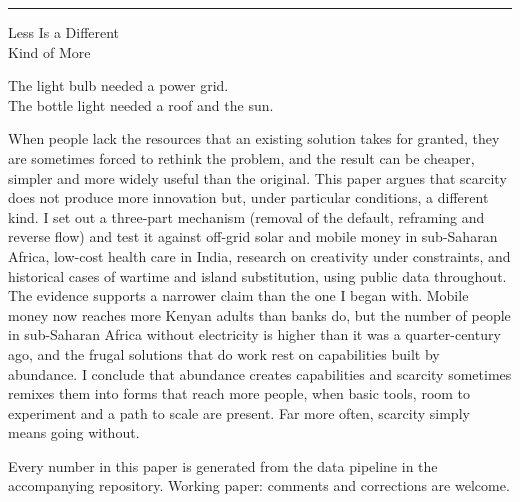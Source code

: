 \begin{titlepage}
\thispagestyle{empty}
\setlength{\parindent}{0pt}
\vspace*{0.1in}

{\sffamily\footnotesize\color{stone}
 \hfill \textls[60]{\MakeUppercase{\paperseries}}\par}
\vspace{6pt}
{\color{indigo}\rule{\linewidth}{1.2pt}}
\vspace{0.42in}

{\fontsize{34}{40}\selectfont\color{indigo}\raggedright
 Less Is a Different\\[2pt] Kind of More\par}
\vspace{14pt}
{\fontsize{17}{21}\selectfont\itshape\color{ink!85}\papersubtitle\par}
\vspace{0.3in}

{\sffamily\normalsize\color{ink}\paperauthor\par}
\vspace{2pt}
{\sffamily\small\color{stone}\paperdate\par}

\vspace{0.32in}
\begin{pullquote}[fontupper=\Large\itshape\color{indigo}]
The light bulb needed a power grid.\\
The bottle light needed a roof and the sun.
\end{pullquote}
\vspace{0.2in}

\begin{abstractbox}
\setlength{\parindent}{0pt}
When people lack the resources that an existing solution takes for granted,
they are sometimes forced to rethink the problem, and the result can be
cheaper, simpler and more widely useful than the original. This paper argues
that scarcity does not produce more innovation but, under particular
conditions, a different kind. I set out a three-part mechanism (removal of
the default, reframing and reverse flow) and test it against off-grid solar
and mobile money in sub-Saharan Africa, low-cost health care in India, research
on creativity under constraints, and historical cases of wartime and island
substitution, using public data throughout. The evidence supports a narrower
claim than the one I began with. Mobile money now reaches more Kenyan adults
than banks do, but the number of people in sub-Saharan Africa without
electricity is higher than it was a quarter-century ago, and the frugal
solutions that do work rest on capabilities built by abundance. I conclude that
abundance creates capabilities and scarcity sometimes remixes them into forms
that reach more people, when basic tools, room to experiment and a path to
scale are present. Far more often, scarcity simply means going without.
\end{abstractbox}

\vfill
{\sffamily\scriptsize\color{stone}
 Every number in this paper is generated from the data pipeline in the
 accompanying repository. Working paper: comments and corrections are welcome.\par}
\end{titlepage}
